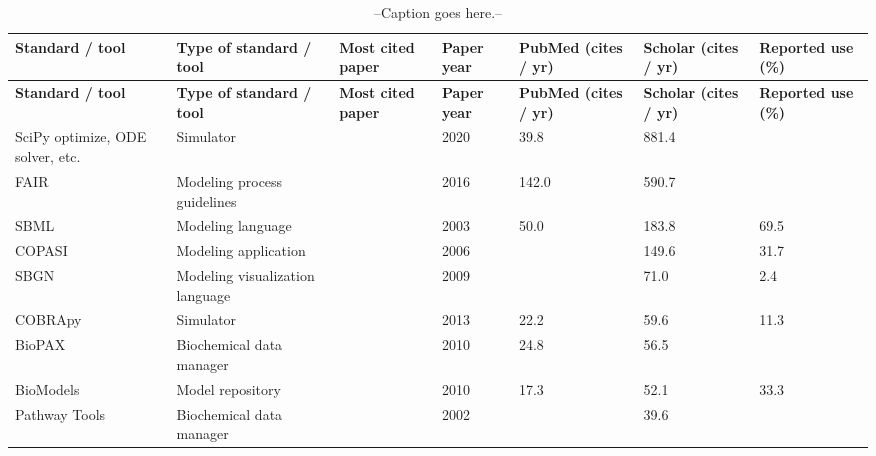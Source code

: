 
\begin{longtable}{L{2.2cm}L{4cm}L{1cm}L{0.8cm}R{1.1cm}R{1cm}R{1cm}}
\caption{--Caption goes here.--}\\
\toprule
\textbf{\scriptsize{Standard / tool}} &\textbf{\scriptsize{Type of standard / tool}} &\textbf{\scriptsize{Most cited paper}} &\textbf{\scriptsize{Paper year}} &\textbf{\scriptsize{PubMed (cites / yr)}} &\textbf{\scriptsize{Scholar (cites / yr)}} &\textbf{\scriptsize{Reported use (\%)}}\\
\endfirsthead
\toprule
\textbf{\scriptsize{Standard / tool}} &\textbf{\scriptsize{Type of standard / tool}} &\textbf{\scriptsize{Most cited paper}} &\textbf{\scriptsize{Paper year}} &\textbf{\scriptsize{PubMed (cites / yr)}} &\textbf{\scriptsize{Scholar (cites / yr)}} &\textbf{\scriptsize{Reported use (\%)}}\\
\midrule
\endhead
\midrule
\small{SciPy optimize, ODE solver, etc.} &\small{Simulator} &\cite{virtanen2020scipy} &\small{2020} &\small{39.8} &\small{881.4} &\small{}\\
\midrule
\small{FAIR} &\small{Modeling process guidelines} &\cite{Wilkinson2016TheStewardship.} &\small{2016} &\small{142.0} &\small{590.7} &\small{}\\
\midrule
\small{SBML} &\small{Modeling language} &\cite{Hucka2003TheModels} &\small{2003} &\small{50.0} &\small{183.8} &\small{69.5}\\
\midrule
\small{COPASI} &\small{Modeling application} &\cite{Hoops2006COPASI--aSImulator} &\small{2006} &\small{} &\small{149.6} &\small{31.7}\\
\midrule
\small{SBGN} &\small{Modeling visualization language} &\cite{Novere2009TheNotation} &\small{2009} &\small{} &\small{71.0} &\small{2.4}\\
\midrule
\small{COBRApy} &\small{Simulator} &\cite{ebrahim2013cobrapy} &\small{2013} &\small{22.2} &\small{59.6} &\small{11.3}\\
\midrule
\small{BioPAX} &\small{Biochemical data manager} &\cite{Demir2010TheSharing.} &\small{2010} &\small{24.8} &\small{56.5} &\small{}\\
\midrule
\small{BioModels} &\small{Model repository} &\cite{Li2010BioModelsModels} &\small{2010} &\small{17.3} &\small{52.1} &\small{33.3}\\
\midrule
\small{Pathway Tools} &\small{Biochemical data manager} &\cite{karp2002pathway} &\small{2002} &\small{} &\small{39.6} &\small{}\\

\end{longtable}
